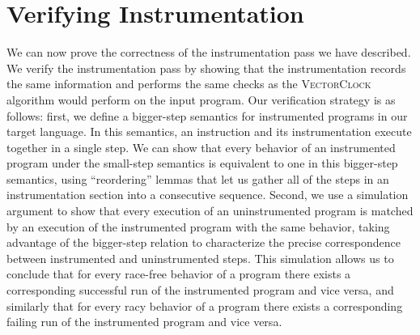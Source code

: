 \documentclass[preprint, 9pt]{sigplanconf}
\newcommand{\VCalg}{\textsc{VectorClock}\xspace}
\begin{document}
\section{Verifying Instrumentation}
\label{verification}
We can now prove the correctness of the instrumentation pass we have described.
We verify the instrumentation pass by showing that the instrumentation records the same information and performs the same checks as the \VCalg algorithm would perform on the input program. Our verification strategy is as follows: first, we define a bigger-step semantics for instrumented programs in our target language. In this semantics, an instruction and its instrumentation execute together in a single step. We can show that every behavior of an instrumented program under the small-step semantics is equivalent to one in this bigger-step semantics, using ``reordering'' lemmas that let us gather all of the steps in an instrumentation section into a consecutive sequence. Second, we use a simulation argument to show that every execution of an uninstrumented program is matched by an execution of the instrumented program with the same behavior, taking advantage of the bigger-step relation to characterize the precise correspondence between instrumented and uninstrumented steps. This simulation allows us to conclude that for every race-free behavior of a program there exists a corresponding successful run of the instrumented program and vice versa, and similarly that for every racy behavior of a program there exists a corresponding failing run of the instrumented program and vice versa.
\end{document}
